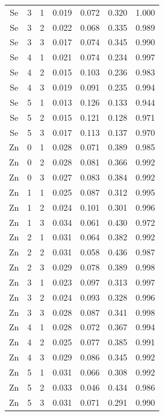 \documentclass[ms, hidelinks]{uncgdissertationexp}
\theoremstyle{plain}
\theoremstyle{definition}
\theoremstyle{remark}
\begin{document}
\begin{longtable}{ccccccc}
Se & 3 & 1 & 0.019 & 0.072 & 0.320 & 1.000\\
\rowcolor{gray!6}  Se & 3 & 2 & 0.022 & 0.068 & 0.335 & 0.989\\
Se & 3 & 3 & 0.017 & 0.074 & 0.345 & 0.990\\
\rowcolor{gray!6}  Se & 4 & 1 & 0.021 & 0.074 & 0.234 & 0.997\\
Se & 4 & 2 & 0.015 & 0.103 & 0.236 & 0.983\\
\rowcolor{gray!6}  Se & 4 & 3 & 0.019 & 0.091 & 0.235 & 0.994\\
Se & 5 & 1 & 0.013 & 0.126 & 0.133 & 0.944\\
\rowcolor{gray!6}  Se & 5 & 2 & 0.015 & 0.121 & 0.128 & 0.971\\
Se & 5 & 3 & 0.017 & 0.113 & 0.137 & 0.970\\
\rowcolor{gray!6}  Zn & 0 & 1 & 0.028 & 0.071 & 0.389 & 0.985\\
Zn & 0 & 2 & 0.028 & 0.081 & 0.366 & 0.992\\
\rowcolor{gray!6}  Zn & 0 & 3 & 0.027 & 0.083 & 0.384 & 0.992\\
Zn & 1 & 1 & 0.025 & 0.087 & 0.312 & 0.995\\
\rowcolor{gray!6}  Zn & 1 & 2 & 0.024 & 0.101 & 0.301 & 0.996\\
Zn & 1 & 3 & 0.034 & 0.061 & 0.430 & 0.972\\
\rowcolor{gray!6}  Zn & 2 & 1 & 0.031 & 0.064 & 0.382 & 0.992\\
Zn & 2 & 2 & 0.031 & 0.058 & 0.436 & 0.987\\
\rowcolor{gray!6}  Zn & 2 & 3 & 0.029 & 0.078 & 0.389 & 0.998\\
Zn & 3 & 1 & 0.023 & 0.097 & 0.313 & 0.997\\
\rowcolor{gray!6}  Zn & 3 & 2 & 0.024 & 0.093 & 0.328 & 0.996\\
Zn & 3 & 3 & 0.028 & 0.087 & 0.341 & 0.998\\
\rowcolor{gray!6}  Zn & 4 & 1 & 0.028 & 0.072 & 0.367 & 0.994\\
Zn & 4 & 2 & 0.025 & 0.077 & 0.385 & 0.991\\
\rowcolor{gray!6}  Zn & 4 & 3 & 0.029 & 0.086 & 0.345 & 0.992\\
Zn & 5 & 1 & 0.031 & 0.066 & 0.308 & 0.992\\
\rowcolor{gray!6}  Zn & 5 & 2 & 0.033 & 0.046 & 0.434 & 0.986\\
Zn & 5 & 3 & 0.031 & 0.071 & 0.291 & 0.990\\*
\end{longtable}
\clearpage
\end{document}
